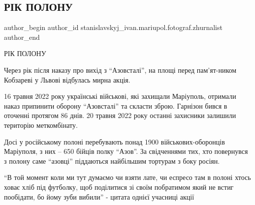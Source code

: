  
 
 
 
 

\subsection{РІК ПОЛОНУ}
\label{sec:20_05_2023.fb.stanislavskyj_ivan.mariupol.fotograf.zhurnalist.1.rik_polonu}

\ifcmt
 author_begin
   author_id stanislavskyj_ivan.mariupol.fotograf.zhurnalist
 author_end
\fi

РІК ПОЛОНУ

Через рік після наказу про вихід з \enquote{Азовсталі}, на площі перед пам'ят\hyp{}ником
Кобзареві у Львові відбулась мирна акція.  

16 травня 2022 року українські військові, які захищали Маріуполь, отримали
наказ припинити оборону \enquote{Азовсталі} та скласти зброю. Гарнізон бився в оточенні
протягом 86 днів. 20 травня 2022 року останні захисники залишили територію
меткомбінату.

Досі у російському полоні перебувають понад 1900 військових-оборонців
Маріуполя, з них – 650 бійців полку \enquote{Азов}. За свідченнями тих, хто повернувся
з полону саме \enquote{азовці} піддаються найбільшим тортурам з боку росіян.

\enquote{В той момент коли ми тут думаємо чи взяти лате, чи еспресо там в полоні хтось
ховає хліб під футболку, щоб поділитися зі своїм побратимом який не встиг
пообідати, бо йому зуби вибили} - цитата однієї учасниці акції
